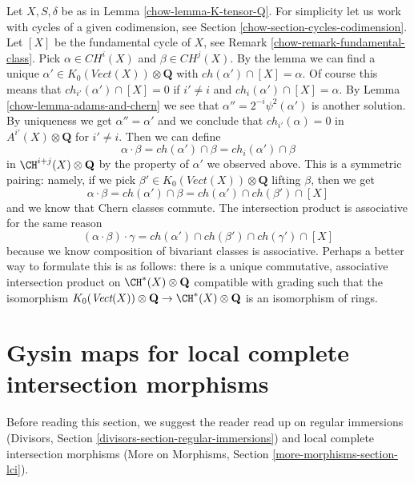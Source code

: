 Let $X, S, \delta$ be as in Lemma \ref{chow-lemma-K-tensor-Q}.
For simplicity let us work with cycles of a given codimension, see
Section \ref{chow-section-cycles-codimension}.
Let $[X]$ be the fundamental cycle of $X$, see
Remark \ref{chow-remark-fundamental-class}.
Pick $\alpha \in CH^i(X)$ and
$\beta \in CH^j(X)$. By the lemma we can find a unique
$\alpha' \in K_0(\textit{Vect}(X)) \otimes \mathbf{Q}$ with
$ch(\alpha') \cap [X]  = \alpha$.
Of course this means that $ch_{i'}(\alpha') \cap [X] = 0$
if $i' \not = i$ and $ch_i(\alpha') \cap [X] = \alpha$.
By Lemma \ref{chow-lemma-adams-and-chern} we see that
$\alpha'' = 2^{-i}\psi^2(\alpha')$ is another solution.
By uniqueness we get $\alpha'' = \alpha'$ and we conclude
that $ch_{i'}(\alpha) = 0$ in $A^{i'}(X) \otimes \mathbf{Q}$
for $i' \not = i$. Then we can define
$$
\alpha \cdot \beta = ch(\alpha') \cap \beta =
ch_i(\alpha') \cap \beta
$$
in $\CH^{i + j}(X) \otimes \mathbf{Q}$ by the property of $\alpha'$
we observed above. This is a symmetric pairing: namely, if we pick
$\beta' \in K_0(\textit{Vect}(X)) \otimes \mathbf{Q}$ lifting
$\beta$, then we get
$$
\alpha \cdot \beta = ch(\alpha') \cap \beta =
ch(\alpha') \cap ch(\beta') \cap [X]
$$
and we know that Chern classes commute.
The intersection product is associative for the same reason
$$
(\alpha \cdot \beta) \cdot \gamma =
ch(\alpha') \cap ch(\beta') \cap ch(\gamma') \cap [X]
$$
because we know composition of bivariant classes is associative.
Perhaps a better way to formulate this is as follows: there is
a unique commutative, associative intersection product on
$\CH^*(X) \otimes \mathbf{Q}$ compatible with grading such that
the isomorphism
$K_0(\textit{Vect}(X)) \otimes \mathbf{Q} \to \CH^*(X) \otimes \mathbf{Q}$
is an isomorphism of rings.

\section{Gysin maps for local complete intersection morphisms}
\label{chow-section-koszul}
Before reading this section, we suggest the reader read up on
regular immersions
(Divisors, Section \ref{divisors-section-regular-immersions}) and
local complete intersection morphisms
(More on Morphisms, Section \ref{more-morphisms-section-lci}).

